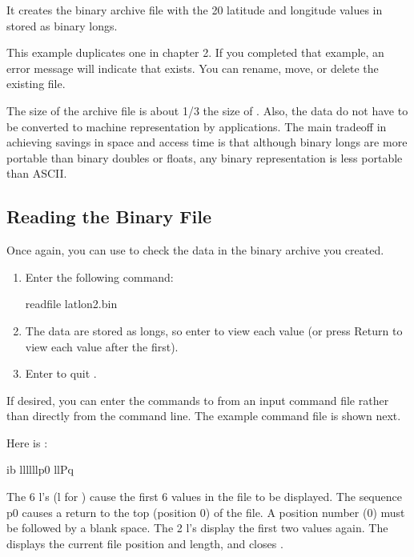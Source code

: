 It creates the binary archive file  with the 20
latitude and longitude values in  stored as binary
longs.

This example duplicates one in chapter 2. If you completed that
example, an error message will indicate that  exists.
You can rename, move, or delete the existing file.

The size of the archive file  is about 1/3 the size
of . Also, the data do not have to be converted to
machine representation by applications. The main tradeoff in achieving
savings in space and access time is that although binary longs are
more portable than binary doubles or floats, any binary representation
is less portable than ASCII.


\subsection{Reading the Binary File}

Once again, you can use  to check the data in the binary
archive you created.

\begin{enumerate}
\item Enter the following command: 

\begin{example}
readfile latlon2.bin 
\end{example}

\item The data are stored as longs, so enter  to view each
  value (or press Return to view each value after the first).

\item Enter  to quit . 
\end{enumerate}

If desired, you can enter the commands to  from an input
command file rather than directly from the command line. The example
command file  is shown next.

Here is :

\begin{vcode}{ib}
llllllp0 llPq 
\end{vcode}

The 6 l's (l for ) cause the first 6 values in the file to be
displayed. The sequence p0 causes a return to the top (position 0) of
the file. A position number (0) must be followed by a blank space. The
2 l's display the first two values again. The  displays the
current file position and length, and  closes .

